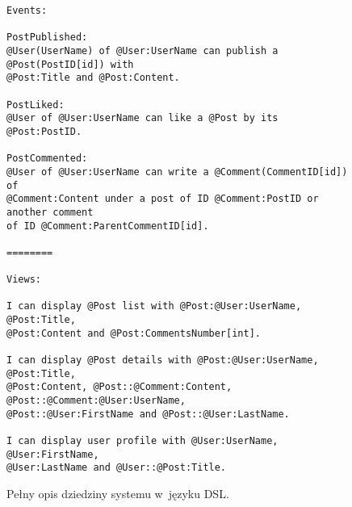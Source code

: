 \begin{figure}[!ht]
\begin{verbatim}
Events:

PostPublished:
@User(UserName) of @User:UserName can publish a @Post(PostID[id]) with
@Post:Title and @Post:Content.

PostLiked:
@User of @User:UserName can like a @Post by its @Post:PostID.

PostCommented:
@User of @User:UserName can write a @Comment(CommentID[id]) of
@Comment:Content under a post of ID @Comment:PostID or another comment
of ID @Comment:ParentCommentID[id].

========

Views:

I can display @Post list with @Post:@User:UserName, @Post:Title,
@Post:Content and @Post:CommentsNumber[int].

I can display @Post details with @Post:@User:UserName, @Post:Title,
@Post:Content, @Post::@Comment:Content, @Post::@Comment:@User:UserName,
@Post::@User:FirstName and @Post::@User:LastName.

I can display user profile with @User:UserName, @User:FirstName,
@User:LastName and @User::@Post:Title.

\end{verbatim}
\caption{
 Pełny opis dziedziny systemu w~języku DSL.
}
\label{fig:single:model_dsl}
\end{figure}
